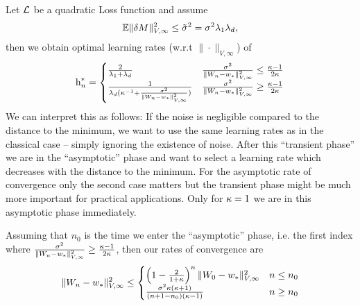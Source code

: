 \begin{theorem}\label{thm: optimal rates quadratic case}
	Let \(\mathcal{L}\) be a quadratic Loss function and assume
	\begin{align*}
		\mathbb{E}\|\delta M\|_{V,\infty}^2
		\le \tilde{\sigma}^2 = \sigma^2 \lambda_1\lambda_d,
	\end{align*}
	then we obtain optimal learning rates (w.r.t \(\|\cdot\|_{V,\infty}\)) of
	\begin{align*}
		\text{h}_n^*
		= \begin{cases}
			\frac{2}{\lambda_1+\lambda_d}
			& \frac{\sigma^2}{\|W_n - w_*\|_{V,\infty}^2}
			\le \frac{\kappa-1}{2\kappa} \\
			\frac1{\lambda_d(\kappa^{-1} + \frac{\sigma^2}{\|W_n-w_*\|_{V,\infty}^2})}
			& \frac{\sigma^2}{\|W_n - w_*\|_{V,\infty}^2}
			\ge \frac{\kappa-1}{2\kappa}
		\end{cases}
	\end{align*}
	We can interpret this as follows: If the noise is negligible compared to the
	distance to the minimum, we want to use the same learning rates as in the
	classical case -- simply ignoring the existence of noise. After this ``transient
	phase'' we are in the ``asymptotic'' phase and want to select a learning rate
	which decreases with the distance to the minimum. For the asymptotic rate of
	convergence only the second case matters but the transient phase might be much
	more important for practical applications. Only for \(\kappa=1\) we are
	in this asymptotic phase immediately.
	
	Assuming that \(n_0\) is the time we enter the ``asymptotic'' phase,
	i.e. the first index where \(\frac{\sigma^2}{\|W_n -
	w_*\|_{V,\infty}^2} \ge
	\frac{\kappa-1}{2\kappa}\),
	then our rates of convergence are
	\begin{align*}
		\|W_n-w_*\|_{V,\infty}^2
		\le \begin{cases}
			\left(1-\tfrac{2}{1+\kappa}\right)^n\|W_0-w_*\|_{V,\infty}^2
			& n \le n_0\\
			\frac{\sigma^2\kappa(\kappa+1)}{(n+1-n_0)(\kappa-1)}
			& n \ge n_0
		\end{cases}
	\end{align*}
\end{theorem}
